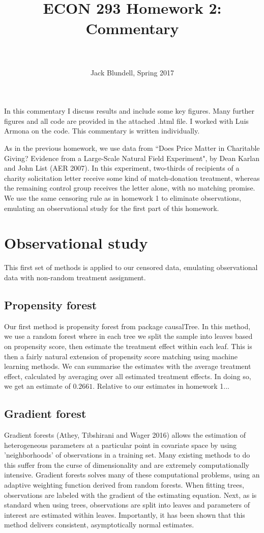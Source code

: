 \documentclass[paper=letter, fontsize=11pt]{scrartcl} %
\title{	
\normalfont \normalsize 
\horrule{0.5pt} \\[0.4cm] %
 \large{{\textbf{ECON 293 Homework 2: Commentary}}} \\ %
\horrule{2pt} \\[0.5cm] %
}
\author{\small{Jack Blundell, Spring 2017}} %
\date{} %
\begin{document}
\maketitle %

In this commentary I discuss results and include some key figures. Many further figures and all code are provided in the attached .html file. I worked with Luis Armona on the code. This commentary is written individually.

As in the previous homework, we use data from ``Does Price Matter in Charitable Giving? Evidence from a Large-Scale Natural Field Experiment", by Dean Karlan and John List (AER 2007). In this experiment, two-thirds of recipients of a charity solicitation letter receive some kind of match-donation treatment, whereas the remaining control group receives the letter alone, with no matching promise. We use the same censoring rule as in homework 1 to eliminate observations, emulating an observational study for the first part of this homework.

\section{Observational study}

This first set of methods is applied to our censored data, emulating observational data with non-random treatment assignment.

\subsection{Propensity forest}

Our first method is propensity forest from package causalTree. In this method, we use a random forest where in each tree we split the sample into leaves based on propensity score, then estimate the treatment effect within each leaf. This is then a fairly natural extension of propensity score matching using machine learning methods. We can summarise the estimates with the average treatment effect, calculated by averaging over all estimated treatment effects. In doing so, we get an estimate of $0.2661$. Relative to our estimates in homework 1...


\subsection{Gradient forest}

Gradient forests (Athey, Tibshirani and Wager 2016) allows the estimation of heterogeneous parameters at a particular point in covariate space by using 'neighborhoods' of observations in a training set. Many existing methods to do this suffer from the curse of dimensionality and are extremely computationally intensive. Gradient forests solves many of these computational problems, using an adaptive weighting function derived from random forests. When fitting trees, observations are labeled with the gradient of the estimating equation. Next, as is standard when using trees, observations are split into leaves and parameters of interest are estimated within leaves. Importantly, it has been shown that this method delivers consistent, asymptotically normal estimates.
\end{document}
